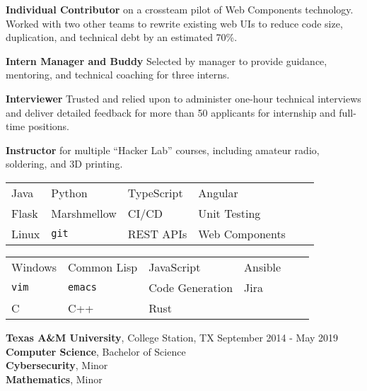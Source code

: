 \documentclass[12pt]{article}
\begin{document}
\begin{flushleft}
\begin{outline}[compactitem]
          \vspace{0.25em}\textbf{Individual Contributor} on a crossteam pilot of Web Components technology.
          Worked with two other teams to rewrite existing web UIs to reduce code size, duplication, and technical debt by an estimated 70\%.

          \vspace{0.25em}\textbf{Intern Manager and Buddy}
          Selected by manager to provide guidance, mentoring, and technical coaching for three interns.

          \vspace{0.25em}\textbf{Interviewer}
          Trusted and relied upon to administer one-hour technical interviews and deliver detailed feedback for more than 50 applicants for internship and full-time positions.

          \vspace{0.25em}\textbf{Instructor} for multiple ``Hacker Lab'' courses, including amateur radio, soldering, and 3D printing.

        \vspace{.25em}
          \vspace{.25em}
          \hspace{0.05\textwidth}\begin{tabularx}{0.9\textwidth}{X X X X X X}
            Java   & Python      & TypeScript  & Angular \\
            Flask  & Marshmellow & CI/CD       & Unit Testing \\
            Linux  & \verb|git|  & REST APIs  & Web Components \\
          \end{tabularx}
          \vspace{.25em}

        \vspace{.25em}
          \vspace{.25em}
          \hspace{0.05\textwidth}\begin{tabularx}{0.9\textwidth}{X X X X X X}
            Windows  & Common Lisp  & JavaScript  & Ansible \\
            \verb|vim| & \verb|emacs| & Code Generation & Jira \\
            C & C++ & Rust
          \end{tabularx}
          \vspace{.25em}

        \1 \textbf{Texas A\&M University}, College Station, TX \hfill September 2014 - May 2019
        \\ \textbf{Computer Science}, Bachelor of Science
        \\ \textbf{Cybersecurity}, Minor
        \\ \textbf{Mathematics}, Minor
    \end{outline}
\end{flushleft}
\end{document}
